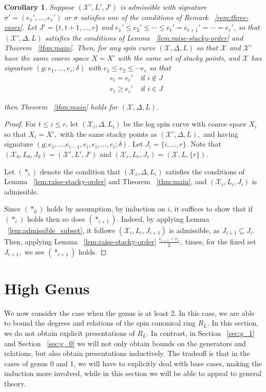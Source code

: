 \documentclass{amsart}
\theoremstyle{plain}
\newtheorem{cor}[thm]{Corollary}
\theoremstyle{definition}
\theoremstyle{remark}
\numberwithin{equation}{section}
\newcommand \sx{\mathscr X}
\newcommand{\halfcan}{L}
\begin{document}
\begin{cor}
\label{cor:raise-stacky-order}
Suppose $(\sx',L',J')$ is admissible with signature $\sigma' = (e_1',\ldots,e_r')$ or $\sigma$ satisfies one of the conditions of Remark ~\ref{rem:three-cases}. Let $J' = \{t,t+1,\ldots,r\}$ and $e_1' \leq e_2' \leq \cdots \leq e_t' = e_{t+1}' =\cdots = e_r'$,
so that $(\sx',\Delta, L)$ satisfies the conditions of Lemma ~\ref{lem:raise-stacky-order} and Theorem ~\ref{thm:main}. Then, for any spin curve $(\sx,\Delta,L)$ so that $\sx$ and $\sx'$ have the same coarse space $X = X'$ with the same set of stacky points, and $\sx$ has signature $(g;e_1,\ldots, e_r;\delta)$ with $e_1 \leq e_2 \leq \cdots e_r$ so that
\begin{align*}
	& e_i	= e_i' &\text{ if }i \notin J \\
	& e_i \ge e_i' &\text{ if } i \in J
\end{align*}

\noindent
then Theorem ~\ref{thm:main} holds for $(\sx,\Delta,L)$.
\end{cor}
\begin{proof}
For $t \leq i \leq r$, let $(\sx_i,\Delta, L_i)$ be the log spin curve with coarse space $X_i$ so that $X_i = X',$ with the same stacky points as $(\sx',\Delta,L),$ and having signature $(g; e_1, \ldots. e_{i-1}, e_i, e_i, \ldots, e_i; \delta).$ Let 
$J_i = \{i,\ldots, r\}.$ Note that $(\sx_0,L_0,J_0) = (\sx',L',J')$ and $(\sx_r ,L_r ,J_r) = (\sx, L, \{r\})$.

Let $(*_i)$ denote the condition that $(\sx_i,\Delta, L_i)$ satisfies the conditions of Lemma ~\ref{lem:raise-stacky-order} and Theorem ~\ref{thm:main}, and $(\sx_i, \halfcan_i, J_i)$ is admissible.

Since $(*_0)$ holds by assumption, by induction on $i$, it suffices to show that if $(*_i)$ holds then so does $(*_{i+1}).$ 
Indeed, by applying Lemma ~\ref{lem:admissible_subset}, it follows $(\sx_i, \halfcan_i, J_{i+1})$ is admissible, as $J_{i+1} \subseteq J_i$. Then, applying Lemma ~\ref{lem:raise-stacky-order} $\frac{e_{i+1}-e_i}{2},$ times, for the fixed set $J_{i+1},$ we see $(*_{i+1})$ holds.
\end{proof}



\section{High Genus}
\label{sec:g_high}
We now consider the case when the genus is at least 2. In this case, we are able to bound the degrees and relations of the spin canonical ring $R_L$. In this section, we do not obtain explicit presentations of $R_L.$ In contrast, in Section ~\ref{sec:g_1} and Section ~\ref{sec:g_0} we will not only obtain bounds on the generators and relations, but also obtain presentations inductively. The tradeoff is that in the cases of genus 0 and 1, we will have to explicitly deal with base cases, making the induction more involved, while in this section we will be able to appeal to general theory.
\end{document}
